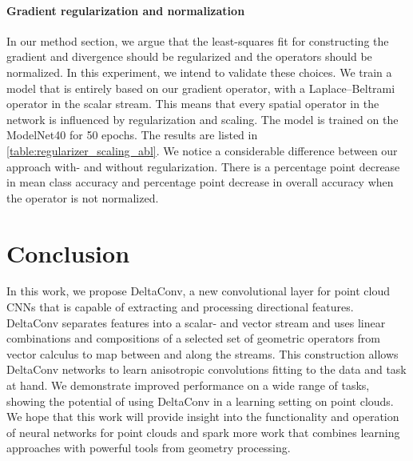 \documentclass[acmtog, authorversion]{acmart}
\begin{document}
\paragraph*{Gradient regularization and normalization}
In our method section, we argue that the least-squares fit for constructing the gradient and divergence should be regularized and the operators should be normalized. In this experiment, we intend to validate these choices. We train a model that is entirely based on our gradient operator, with a Laplace--Beltrami operator in the scalar stream. This means that every spatial operator in the network is influenced by regularization and scaling. The model is trained on the ModelNet40 for 50 epochs. The results are listed in \autoref{table:regularizer_scaling_abl}. We notice a considerable difference between our approach with- and without regularization. There is a  percentage point decrease in mean class accuracy and  percentage point decrease in overall accuracy when the operator is not normalized.

\begin{table}[t]
    \caption{Classification accuracy on ModelNet40 with and without regularization and normalization.}
    \label{table:regularizer_scaling_abl}
    \begin{center}
    \end{center}
\end{table}  \section{Conclusion}
In this work, we propose DeltaConv, a new convolutional layer for point cloud CNNs that is capable of extracting and processing directional features. DeltaConv separates features into a scalar- and vector stream and uses linear combinations and compositions of a selected set of geometric operators from vector calculus to map between and along the streams. 
This construction allows DeltaConv networks to learn anisotropic convolutions fitting to the data and task at hand.
We demonstrate improved performance on a wide range of tasks, showing the potential of using DeltaConv in a learning setting on point clouds. We hope that this work will provide insight into the functionality and operation of neural networks for point clouds and spark more work that combines learning approaches with powerful tools from geometry processing.
\end{document}
